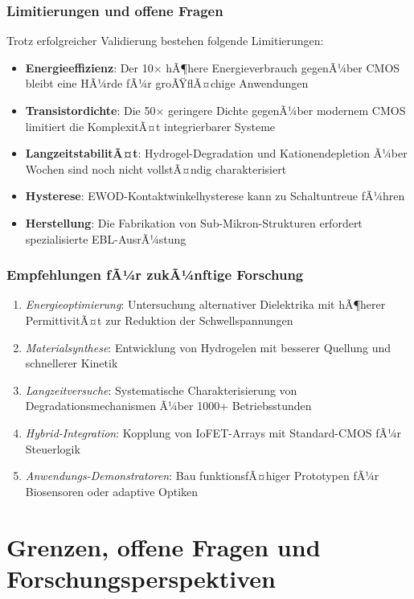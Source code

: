 ﻿\documentclass[a4paper,12pt]{scrreprt}
\theoremstyle{definition}
\begin{document}
\subsubsection{Limitierungen und offene Fragen}

Trotz erfolgreicher Validierung bestehen folgende Limitierungen:

\begin{itemize}
	\item \textbf{Energieeffizienz}: Der 10$\times$ hÃ¶here Energieverbrauch gegenÃ¼ber CMOS bleibt eine HÃ¼rde fÃ¼r groÃŸflÃ¤chige Anwendungen
	\item \textbf{Transistordichte}: Die 50$\times$ geringere Dichte gegenÃ¼ber modernem CMOS limitiert die KomplexitÃ¤t integrierbarer Systeme
	\item \textbf{LangzeitstabilitÃ¤t}: Hydrogel-Degradation und Kationendepletion Ã¼ber Wochen sind noch nicht vollstÃ¤ndig charakterisiert
	\item \textbf{Hysterese}: EWOD-Kontaktwinkelhysterese kann zu Schaltuntreue fÃ¼hren
	\item \textbf{Herstellung}: Die Fabrikation von Sub-Mikron-Strukturen erfordert spezialisierte EBL-AusrÃ¼stung
\end{itemize}

\subsubsection{Empfehlungen fÃ¼r zukÃ¼nftige Forschung}

\begin{enumerate}
	\item \emph{Energieoptimierung}: Untersuchung alternativer Dielektrika mit hÃ¶herer PermittivitÃ¤t zur Reduktion der Schwellspannungen
	\item \emph{Materialsynthese}: Entwicklung von Hydrogelen mit besserer Quellung und schnellerer Kinetik
	\item \emph{Langzeitversuche}: Systematische Charakterisierung von Degradationsmechanismen Ã¼ber 1000+ Betriebsstunden
	\item \emph{Hybrid-Integration}: Kopplung von IoFET-Arrays mit Standard-CMOS fÃ¼r Steuerlogik
	\item \emph{Anwendungs-Demonstratoren}: Bau funktionsfÃ¤higer Prototypen fÃ¼r Biosensoren oder adaptive Optiken
\end{enumerate}

\section{Grenzen, offene Fragen und Forschungsperspektiven}
\end{document}

